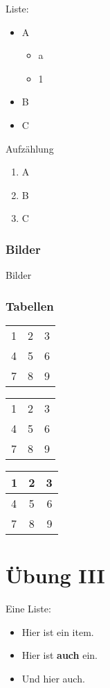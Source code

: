 Liste:
\begin{itemize}
	\item A
	      \begin{itemize}
		      \item a
		      \item 1
	      \end{itemize}
	\item B
	\item C
\end{itemize}
Aufzählung
\begin{enumerate}
	\item A
	\item B
	\item C
\end{enumerate}

\subsubsection{Bilder}
Bilder


\subsubsection{Tabellen}
\begin{tabular}{lcr}
	1 & 2 & 3 \\
	4 & 5 & 6 \\
	7 & 8 & 9 \\
\end{tabular}

\begin{tabular}{l|c|r}
	1 & 2 & 3 \\
	4 & 5 & 6 \\
	7 & 8 & 9 \\
\end{tabular}

\begin{center}
	\begin{tabular}{|l|c|r|}
		\hline
		1 & 2 & 3 \\
		\hline
		4 & 5 & 6 \\
		\hline
		7 & 8 & 9 \\
		\hline
	\end{tabular}
\end{center}
\section*{Übung III}
Eine Liste:
\begin{itemize}
	\item Hier ist ein item.
	\item Hier ist \textbf{auch} ein.
	\item Und hier auch.
\end{itemize}

